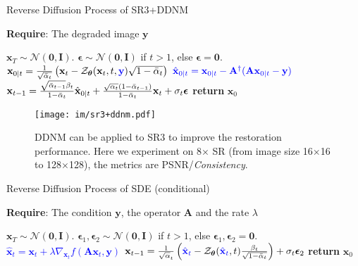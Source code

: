 \documentclass{article} \usepackage{iclr2023_conference,times}
\begin{document}
\begin{algorithm}[h]
\caption{Reverse Diffusion Process of SR3+DDNM}
\label{alg:sr3+ddnm}
\textbf{Require}: The degraded image $\mathbf{y}$
\begin{algorithmic}[1] \State $\mathbf{x}_{T}\sim\mathcal{N}(\mathbf{0},\mathbf{I})$.
\State $\boldsymbol{\epsilon}\sim\mathcal{N}(\mathbf{0},\mathbf{I})$ if $t>1$, else $\boldsymbol{\epsilon}=\mathbf{0}$.
\State $\mathbf{x}_{0|t} = \frac{1}{\sqrt{\bar{\alpha}_{t}}}	\left( \mathbf{x}_{t} - \mathcal{Z}_{\boldsymbol{\theta}}(\mathbf{x}_{t},t,\textcolor{blue}{\mathbf{y}})\sqrt{1-\Bar{\alpha}_{t}} \right)$
\State $\textcolor{blue}{\hat{\mathbf{x}}_{0|t} = \mathbf{x}_{0|t} -  \mathbf{A}^{\dagger}(\mathbf{Ax}_{0|t}-\mathbf{y})}$
\State $\mathbf{x}_{t-1} = \frac{\sqrt{\Bar{\alpha}_{t-1}}\beta_{t}}{1-\Bar{\alpha}_{t}}\hat{\mathbf{x}}_{0|t}+ \frac{\sqrt{\alpha_{t}}(1-\Bar{\alpha}_{t-1})}{1-\Bar{\alpha}_{t}}\mathbf{x}_{t} + \sigma_{t}\boldsymbol{\epsilon}$
\EndFor
\State \textbf{return} $\mathbf{x}_{0}$
\end{algorithmic}
\end{algorithm}
\begin{figure*}[!h]
  \centering
\texttt{[image: im/sr3+ddnm.pdf]}
  \caption{DDNM can be applied to SR3 to improve the restoration performance. Here we experiment on 8$\times$ SR (from image size 16$\times$16 to 128$\times$128), the metrics are PSNR/\textit{Consistency}.}
\label{fig:sr3+ddnm} 
\end{figure*}
\begin{algorithm}[h]
\caption{Reverse Diffusion Process of SDE (conditional)}
\label{alg:sdec}
\textbf{Require}: The condition $\mathbf{y}$, the operator $\mathbf{A}$ and the rate $\lambda$
\begin{algorithmic}[1] \State $\mathbf{x}_{T}\sim\mathcal{N}(\mathbf{0},\mathbf{I})$.
\State $\boldsymbol{\epsilon}_{1},\boldsymbol{\epsilon}_{2}\sim\mathcal{N}(\mathbf{0},\mathbf{I})$ if $t>1$, else $\boldsymbol{\epsilon}_{1},\boldsymbol{\epsilon}_{2}=\mathbf{0}$.
\State \textcolor{blue}{$\hat{\mathbf{x}}_{t} =\mathbf{x}_{t} +\lambda\nabla_{\mathbf{x}_{t}}f(\mathbf{A}\mathbf{x}_{t},\mathbf{y})$}
\State $\mathbf{x}_{t-1} = \frac{1}{\sqrt{\alpha}_{t}}	\left( \textcolor{blue}{\hat{\mathbf{x}}_{t}} - \mathcal{Z}_{\boldsymbol{\theta}}(\textcolor{blue}{\hat{\mathbf{x}}_{t}},t)\frac{\beta_{t}}{\sqrt{1-\Bar{\alpha}_{t}}} \right)+ \sigma_{t}\boldsymbol{\epsilon}_{2}$
\EndFor
\State \textbf{return} $\mathbf{x}_{0}$
\end{algorithmic}
\end{algorithm}
\end{document}
